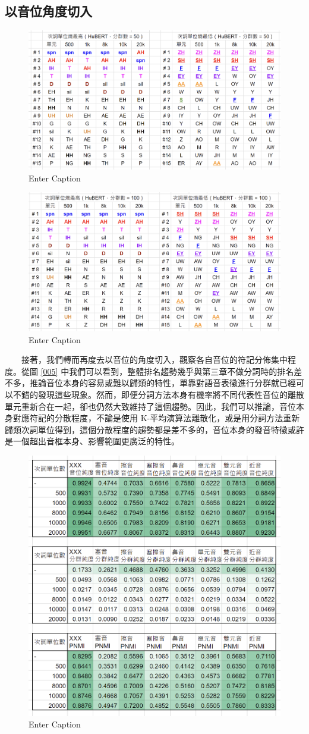 {\subsection{以音位角度切入}

\begin{figure}
    \centering
    \includegraphics[width=0.5\linewidth]{phnrank-hub50pcs.png}
    \caption{Enter Caption}
    \label{fig:enter-label}
\end{figure}

\begin{figure}
    \centering
    \includegraphics[width=0.5\linewidth]{phnrank-hub100pcs.png}
    \caption{Enter Caption}
    \label{fig:enter-label}
\end{figure}
　　接著，我們轉而再度去以音位的角度切入，觀察各自音位的符記分佈集中程度。從圖 \ref{005} 中我們可以看到，整體排名趨勢幾乎與第三章不做分詞時的排名差不多，推論音位本身的容易或難以歸類的特性，單靠對語音表徵進行分群就已經可以不錯的發現這些現象。然而，即便分詞方法本身有機率將不同代表性音位的離散單元重新合在一起，卻也仍然大致維持了這個趨勢。因此，我們可以推論，音位本身對應符記的分散程度，不論是使用 K-平均演算法離散化，或是用分詞方法重新歸類次詞單位得到，這個分散程度的趨勢都是差不多的，音位本身的發音特徵或許是一個超出音框本身、影響範圍更廣泛的特性。 \par




{
\begin{figure}
    \centering
    \includegraphics[width=0.5\linewidth]{hub50-ap-detailedpur.png}
    \caption{Enter Caption}
    \label{fig:hub50-ap-detailedpur}
\end{figure}
}


}

